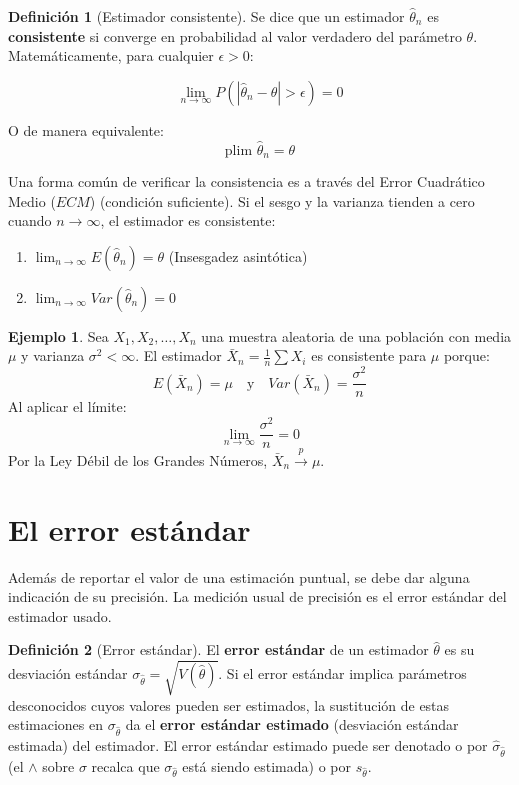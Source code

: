 \documentclass[
  11pt,
]{book}
\providecommand{\tightlist}{%
  \setlength{\itemsep}{0pt}\setlength{\parskip}{0pt}}
\theoremstyle{definition}
\newtheorem{definition}{Definición}[chapter]
\theoremstyle{definition}
\newtheorem{example}{Ejemplo}[chapter]
\theoremstyle{definition}
\theoremstyle{definition}
\theoremstyle{remark}
\begin{document}
\begin{definition}[Estimador consistente]
Se dice que un estimador \(\hat{\theta}_n\) es \textbf{consistente} si converge en probabilidad al valor verdadero del parámetro \(\theta\). Matemáticamente, para cualquier \(\epsilon > 0\):

\[ \lim_{n \to \infty} P(|\hat{\theta}_n - \theta| > \epsilon) = 0 \]

O de manera equivalente:
\[ \text{plim } \hat{\theta}_n = \theta \]
\end{definition}

Una forma común de verificar la consistencia es a través del Error Cuadrático Medio (\(ECM\)) (condición suficiente). Si el sesgo y la varianza tienden a cero cuando \(n \to \infty\), el estimador es consistente:

\begin{enumerate}
\def\labelenumi{\alph{enumi}.}
\tightlist
\item
  \(\lim_{n \to \infty} E(\hat{\theta}_n) = \theta\) (Insesgadez asintótica)
\item
  \(\lim_{n \to \infty} Var(\hat{\theta}_n) = 0\)
\end{enumerate}

\begin{example}
Sea \(X_1, X_2, \dots, X_n\) una muestra aleatoria de una población con media \(\mu\) y varianza \(\sigma^2 < \infty\). El estimador \(\bar{X}_n = \frac{1}{n} \sum X_i\) es consistente para \(\mu\) porque:
\[ E(\bar{X}_n) = \mu \quad \text{y} \quad Var(\bar{X}_n) = \frac{\sigma^2}{n} \]
Al aplicar el límite:
\[ \lim_{n \to \infty} \frac{\sigma^2}{n} = 0 \]
Por la Ley Débil de los Grandes Números, \(\bar{X}_n \xrightarrow{p} \mu\).
\end{example}

\section{El error estándar}\label{el-error-estuxe1ndar}

Además de reportar el valor de una estimación puntual, se debe dar alguna indicación de su precisión. La medición usual de precisión es el error estándar del estimador usado.

\begin{definition}[Error estándar]
El \textbf{error estándar} de un estimador \(\hat{\theta}\) es su desviación estándar \(\sigma_{\hat{\theta}} = \sqrt{V(\hat{\theta})}\). Si el error estándar implica parámetros desconocidos cuyos valores pueden ser estimados, la sustitución de estas estimaciones en \(\sigma_{\hat{\theta}}\) da el \textbf{error estándar estimado} (desviación estándar estimada) del estimador. El error estándar estimado puede ser denotado o por \(\hat{\sigma}_{\hat{\theta}}\) (el \(\wedge\) sobre \(\sigma\) recalca que \(\sigma_{\hat{\theta}}\) está siendo estimada) o por \(s_{\hat{\theta}}\).
\end{definition}
\end{document}
